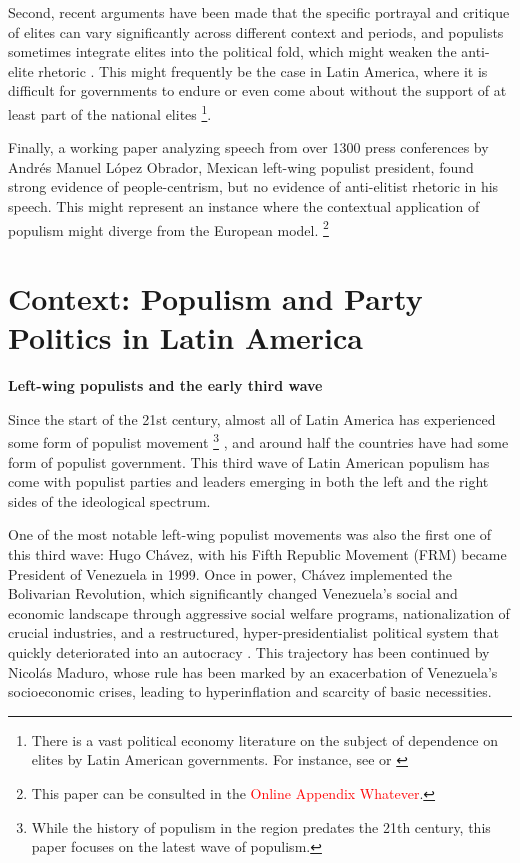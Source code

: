 \documentclass[12pt,letterpaper]{article}
\begin{document}
Second, recent arguments have been made that the specific portrayal and critique of elites can vary significantly across different context and periods, and populists sometimes integrate elites into the political fold, which might weaken the anti-elite rhetoric \autocite{hawkinsIdeationalApproachPopulism2017} . This might frequently be the case in Latin America, where it is difficult for governments to endure or even come about without the support of at least part of the national elites
\footnote{There is a vast political economy literature on the subject of dependence on elites by Latin American governments. For instance, see \autocite{lopezStatesElitesInequality2018} or \autocite{alcantaraPoliticsPoliticalElites2020}}. 

Finally, a working paper analyzing speech from over 1300 press conferences by Andrés Manuel López Obrador, Mexican left-wing populist president, found strong evidence of people-centrism, but no evidence of anti-elitist rhetoric in his speech. This might represent an instance where the contextual application of populism might diverge from the European model. 
\footnote{This paper can be consulted in the \textcolor{red}{Online Appendix Whatever}.}

\section*{Context: Populism and Party Politics in Latin America} 

\vspace{.25cm}
\noindent \textbf{Left-wing populists and the early third wave} 
\vspace{.25cm}

\noindent Since the start of the 21st century, almost all of Latin America has experienced some form of populist movement \footnote{While the history of populism in the region predates the 21th century, this paper focuses on the latest wave of populism.} , and around half the countries have had some form of populist government. This third wave of Latin American populism has come with populist parties and leaders emerging in both the left and the right sides of the ideological spectrum. 

One of the most notable left-wing populist movements was also the first one of this third wave: Hugo Chávez, with his Fifth Republic Movement (FRM) became President of Venezuela in 1999. Once in power, Chávez implemented the Bolivarian Revolution, which significantly changed Venezuela's social and economic landscape through aggressive social welfare programs, nationalization of crucial industries, and a restructured, hyper-presidentialist political system that quickly deteriorated into an autocracy \autocite{cannonHugoChavezBolivarian2009}. This trajectory has been continued by Nicolás Maduro, whose rule has been marked by an exacerbation of Venezuela's socioeconomic crises, leading to hyperinflation and scarcity of basic necessities. 
\end{document}
